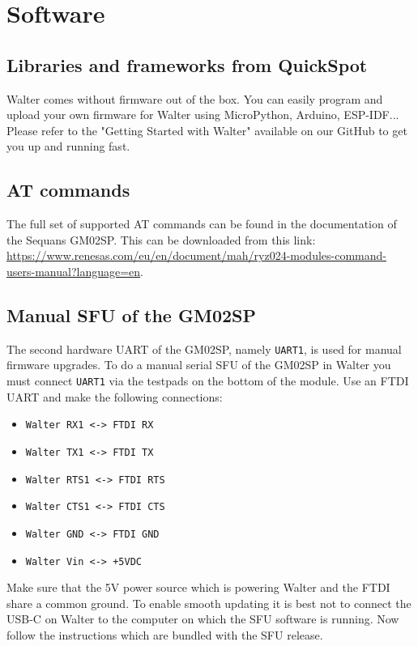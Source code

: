 \documentclass[11pt]{article}
\begin{document}
\section{Software}
\subsection{Libraries and frameworks from QuickSpot}
Walter comes without firmware out of the box. You can easily program and upload your own firmware for Walter using MicroPython, Arduino, ESP-IDF... 
Please refer to the "Getting Started with Walter" available on our GitHub to get you up and running fast.

\subsection{AT commands}

The full set of supported AT commands can be found in the documentation of the Sequans GM02SP. This can be downloaded from this link: \href{https://www.renesas.com/eu/en/document/mah/ryz024-modules-command-users-manual?language=en}{https://www.renesas.com/eu/en/document/mah/ryz024-modules-command-users-manual?language=en}.

\subsection{Manual SFU of the GM02SP}

The second hardware UART of the GM02SP, namely \verb+UART1+, is used for manual firmware upgrades. To do a manual serial SFU of the GM02SP in Walter you must connect \verb+UART1+ via the testpads on the bottom of the module. Use an FTDI UART and make the following connections:
\begin{itemize}
	\item \verb+Walter RX1 <-> FTDI RX+
	\item \verb+Walter TX1 <-> FTDI TX+
	\item \verb+Walter RTS1 <-> FTDI RTS+
	\item \verb+Walter CTS1 <-> FTDI CTS+
	\item \verb+Walter GND <-> FTDI GND+
	\item \verb$Walter Vin <-> +5VDC$
\end{itemize}
Make sure that the 5V power source which is powering Walter and the FTDI share a common ground. To enable smooth updating it is best not to connect the USB-C on Walter to the computer on which the SFU software is running. Now follow the instructions which are bundled with the SFU release.
\end{document}
